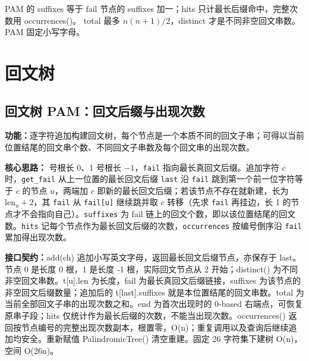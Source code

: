 PAM 的 suffixes 等于 fail 节点的 suffixes 加一；hits 只计最长后缀命中，完整次数用 occurrences()。
total 最多 $n(n+1)/2$，distinct 才是不同非空回文串数。PAM 固定小写字母。


\Needspace{624pt}

\chapter{回文树}

\section{回文树 PAM：回文后缀与出现次数}\label{compact-PalindromicTree}

\noindent\textbf{功能：}\allowbreak 逐字符追加构建回文树，每个节点是一个本质不同的回文子串；可得以当前位置结尾的回文串个数、不同回文子串数及每个回文串的出现次数。

\textbf{核心思路：} 号根长 0、1 号根长 $-1$，\texttt{fail} 指向最长真回文后缀。追加字符 $c$ 时，\texttt{get\_fail} 从上一位置的最长回文后缀 \texttt{last} 沿 \texttt{fail} 跳到第一个前一位字符等于 $c$ 的节点 $u$，两端加 $c$ 即新的最长回文后缀；若该节点不存在就新建，长为 $\mathrm{len}_u+2$，其 \texttt{fail} 从 \texttt{fail[u]} 继续跳并取 $c$ 转移（先求 \texttt{fail} 再挂边，长 1 的节点才不会指向自己）。\texttt{suffixes} 为 fail 链上的回文个数，即以该位置结尾的回文数。\texttt{hits} 记每个节点作为最长回文后缀的次数，\texttt{occurrences} 按编号倒序沿 \texttt{fail} 累加得出现次数。



{\sloppy{}\noindent\textbf{接口契约：}add(ch) 追加小写英文字母，返回最长回文后缀节点，亦保存于 last。节点 0 是长度 0 根，1 是长度 -1 根，实际回文节点从 2 开始；distinct() 为不同非空回文串数。t[u].len 为长度，fail 为最长真回文后缀链接，suffixes 为该节点的非空回文后缀数量；追加后的 t[last].suffixes 就是本位置结尾的回文串数。total 为当前全部回文子串的出现次数之和。end 为首次出现时的 0-based 右端点，可恢复原串子段；hits 仅统计作为最长后缀的次数，不能当出现次数。occurrences() 返回按节点编号的完整出现次数副本，根置零，O(n)；重复调用以及查询后继续追加均安全。重新赋值 PalindromicTree() 清空重建。固定 26 字符集下建树 O(n)，空间 O(26n)。\par}

\Needspace{387pt}



\newpage

